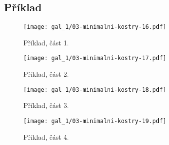 \subsection*{Příklad}

\begin{figure}[H]
    \centering
    \texttt{[image: gal\_1/03-minimalni-kostry-16.pdf]}
    \caption{Příklad, část 1.}
\end{figure}

\begin{figure}[H]
    \centering
    \texttt{[image: gal\_1/03-minimalni-kostry-17.pdf]}
    \caption{Příklad, část 2.}
\end{figure}

\begin{figure}[H]
    \centering
    \texttt{[image: gal\_1/03-minimalni-kostry-18.pdf]}
    \caption{Příklad, část 3.}
\end{figure}

\begin{figure}[H]
    \centering
    \texttt{[image: gal\_1/03-minimalni-kostry-19.pdf]}
    \caption{Příklad, část 4.}
\end{figure}
